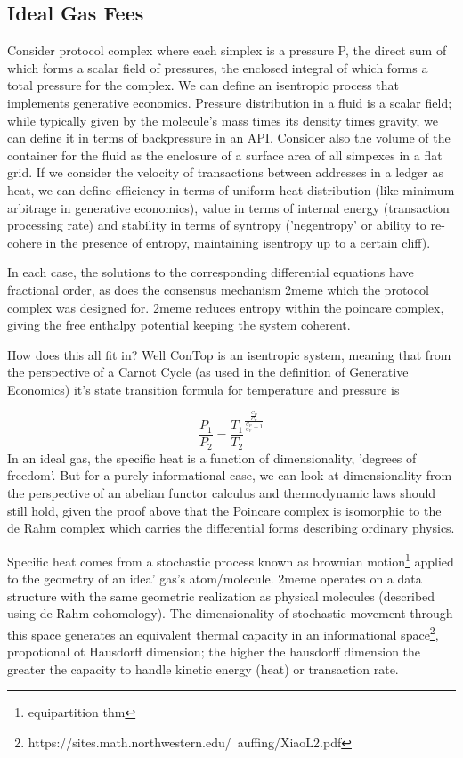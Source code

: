 \documentclass{article}
\theoremstyle{definition}
\theoremstyle{remark}
\theoremstyle{plain}
\begin{document}
\subsection{Ideal Gas Fees}
Consider protocol complex where each simplex is a pressure P, the direct sum of which forms a scalar field of pressures, the enclosed integral of which forms a total pressure for the complex. We can define an isentropic process that implements generative economics. Pressure distribution in a fluid is a scalar field; while typically given by the molecule's mass times its density times gravity, we can define it in terms of backpressure in an API. Consider also the volume of the container for the fluid as the enclosure of a surface area of all simpexes in a flat grid. If we consider the velocity of transactions between addresses in a ledger as heat, we can define efficiency in terms of uniform heat distribution (like minimum arbitrage in generative economics), value in terms of internal energy (transaction processing rate) and stability in terms of syntropy ('negentropy' or ability to re-cohere in the presence of entropy, maintaining isentropy up to a certain cliff).

In each case, the solutions to the corresponding differential equations have fractional order, as does the consensus mechanism 2meme which the protocol complex was designed for. 2meme reduces entropy within the poincare complex, giving the free enthalpy potential keeping the system coherent.

How does this all fit in? Well ConTop is an isentropic system, meaning that from the perspective of a Carnot Cycle (as used in the definition of Generative Economics) it's state transition formula for temperature and pressure is 

\begin{equation}
\frac{P_1}{P_2} = \frac{T_1}{T_2}^{\frac{\frac{C_P}{C_V}}{\frac{C_P}{C_V}-1}}
\end{equation}
In an ideal gas, the specific heat is a function of dimensionality, 'degrees of freedom'. But for a purely informational case, we can look at dimensionality from the perspective of an abelian functor calculus and thermodynamic laws should still hold, given the proof above that the Poincare complex is isomorphic to the de Rahm complex which carries the differential forms describing ordinary physics.

Specific heat comes from a stochastic process known as brownian motion\footnote{equipartition thm} applied to the geometry of an idea' gas's atom/molecule. 2meme operates on a data structure with the same geometric realization as physical molecules (described using de Rahm cohomology). The dimensionality of stochastic movement through this space generates an equivalent thermal capacity in an informational space\footnote{https://sites.math.northwestern.edu/~auffing/XiaoL2.pdf}, propotional ot Hausdorff dimension; the higher the hausdorff dimension the greater the capacity to handle kinetic energy (heat) or transaction rate.
\end{document}
